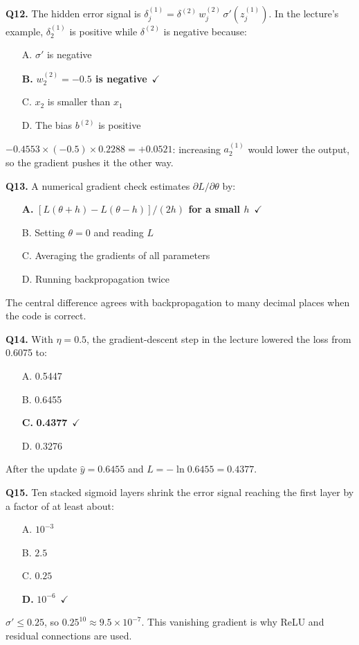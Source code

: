 \documentclass[11pt]{article}
\begin{document}
{\noindent\textbf{Q12.} The hidden error signal is $\delta^{(1)}_j=\delta^{(2)}\,w^{(2)}_j\,\sigma'(z^{(1)}_j)$. In the lecture's example, $\delta^{(1)}_2$ is positive while $\delta^{(2)}$ is negative because:\begin{itemize}[leftmargin=2.2em,itemsep=0pt,topsep=1pt]\item[A.] $\sigma'$ is negative\item[\textbf{B.}] \textbf{$w^{(2)}_2=-0.5$ is negative}~{\color{GrnN}$\checkmark$}\item[C.] $x_2$ is smaller than $x_1$\item[D.] The bias $b^{(2)}$ is positive\end{itemize} $-0.4553\times(-0.5)\times0.2288=+0.0521$: increasing $a^{(1)}_2$ would lower the output, so the gradient pushes it the other way.\par\medskip

\noindent\textbf{Q13.} A numerical gradient check estimates $\partial L/\partial\theta$ by:\begin{itemize}[leftmargin=2.2em,itemsep=0pt,topsep=1pt]\item[\textbf{A.}] \textbf{$[L(\theta+h)-L(\theta-h)]/(2h)$ for a small $h$}~{\color{GrnN}$\checkmark$}\item[B.] Setting $\theta=0$ and reading $L$\item[C.] Averaging the gradients of all parameters\item[D.] Running backpropagation twice\end{itemize} The central difference agrees with backpropagation to many decimal places when the code is correct.\par\medskip

\noindent\textbf{Q14.} With $\eta=0.5$, the gradient-descent step in the lecture lowered the loss from 0.6075 to:\begin{itemize}[leftmargin=2.2em,itemsep=0pt,topsep=1pt]\item[A.] 0.5447\item[B.] 0.6455\item[\textbf{C.}] \textbf{0.4377}~{\color{GrnN}$\checkmark$}\item[D.] 0.3276\end{itemize} After the update $\hat y=0.6455$ and $L=-\ln0.6455=0.4377$.\par\medskip

\noindent\textbf{Q15.} Ten stacked sigmoid layers shrink the error signal reaching the first layer by a factor of at least about:\begin{itemize}[leftmargin=2.2em,itemsep=0pt,topsep=1pt]\item[A.] $10^{-3}$\item[B.] $2.5$\item[C.] $0.25$\item[\textbf{D.}] \textbf{$10^{-6}$}~{\color{GrnN}$\checkmark$}\end{itemize} $\sigma'\le0.25$, so $0.25^{10}\approx9.5\times10^{-7}$. This vanishing gradient is why ReLU and residual connections are used.\par\medskip

}
\end{document}
